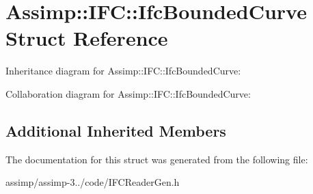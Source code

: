 \hypertarget{struct_assimp_1_1_i_f_c_1_1_ifc_bounded_curve}{\section{Assimp\+:\+:I\+F\+C\+:\+:Ifc\+Bounded\+Curve Struct Reference}
\label{struct_assimp_1_1_i_f_c_1_1_ifc_bounded_curve}
}


Inheritance diagram for Assimp\+:\+:I\+F\+C\+:\+:Ifc\+Bounded\+Curve\+:


Collaboration diagram for Assimp\+:\+:I\+F\+C\+:\+:Ifc\+Bounded\+Curve\+:
\subsection*{Additional Inherited Members}


The documentation for this struct was generated from the following file\+:\begin{DoxyCompactItemize}
\item 
assimp/assimp-\/3../code/I\+F\+C\+Reader\+Gen.\+h\end{DoxyCompactItemize}
